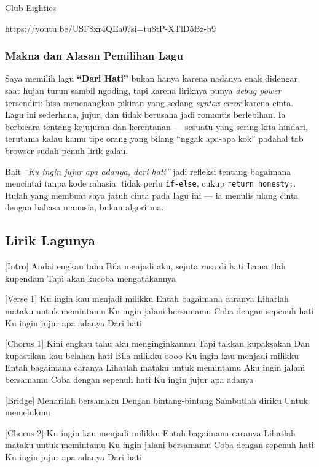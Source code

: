 \documentclass[
  letterpaper,
  DIV=11,
  numbers=noendperiod]{scrreprt}
\begin{document}
Club Eighties

\url{https://youtu.be/USF8xr4QEa0?si=tu8tP-XTlD5Bz-b9}

\subsubsection{Makna dan Alasan Pemilihan
Lagu}\label{makna-dan-alasan-pemilihan-lagu}

Saya memilih lagu \textbf{``Dari Hati''} bukan hanya karena nadanya enak
didengar saat hujan turun sambil ngoding, tapi karena liriknya punya
\emph{debug power} tersendiri: bisa menenangkan pikiran yang sedang
\emph{syntax error} karena cinta.\\
Lagu ini sederhana, jujur, dan tidak berusaha jadi romantis berlebihan.
Ia berbicara tentang kejujuran dan kerentanan --- sesuatu yang sering
kita hindari, terutama kalau kamu tipe orang yang bilang ``nggak apa-apa
kok'' padahal tab browser sudah penuh lirik galau.

Bait \emph{``Ku ingin jujur apa adanya, dari hati''} jadi refleksi
tentang bagaimana mencintai tanpa kode rahasia: tidak perlu
\texttt{if-else}, cukup \texttt{return\ honesty;}.\\
Itulah yang membuat saya jatuh cinta pada lagu ini --- ia menulis ulang
cinta dengan bahasa manusia, bukan algoritma.

\subsection{Lirik Lagunya}\label{lirik-lagunya}

{[}Intro{]} Andai engkau tahu Bila menjadi aku, sejuta rasa di hati Lama
tlah kupendam Tapi akan kucoba mengatakannya

{[}Verse 1{]} Ku ingin kau menjadi milikku Entah bagaimana caranya
Lihatlah mataku untuk memintamu Ku ingin jalani bersamamu Coba dengan
sepenuh hati Ku ingin jujur apa adanya Dari hati

{[}Chorus 1{]} Kini engkau tahu aku menginginkanmu Tapi takkan
kupaksakan Dan kupastikan kau belahan hati Bila milikku oooo Ku ingin
kau menjadi milikku Entah bagaimana caranya Lihatlah mataku untuk
memintamu Aku ingin jalani bersamamu Coba dengan sepenuh hati Ku ingin
jujur apa adanya

{[}Bridge{]} Menarilah bersamaku Dengan bintang-bintang Sambutlah diriku
Untuk memelukmu

{[}Chorus 2{]} Ku ingin kau menjadi milikku Entah bagaimana caranya
Lihatlah mataku untuk memintamu Ku ingin jalani bersamamu Coba dengan
sepenuh hati Ku ingin jujur apa adanya Dari hati
\end{document}
